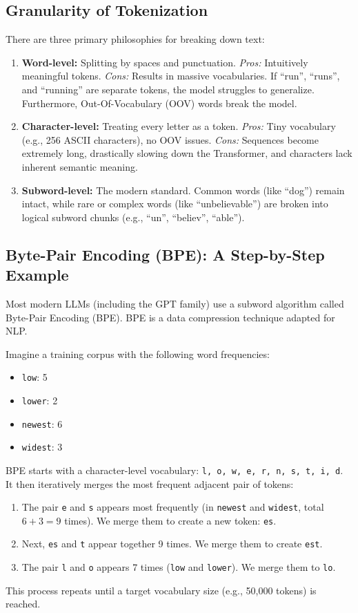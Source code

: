 \documentclass[11pt, a4paper]{article}
\begin{document}
\subsection{Granularity of Tokenization}
There are three primary philosophies for breaking down text:
\begin{enumerate}
    \item \textbf{Word-level:} Splitting by spaces and punctuation. \textit{Pros:} Intuitively meaningful tokens. \textit{Cons:} Results in massive vocabularies. If ``run'', ``runs'', and ``running'' are separate tokens, the model struggles to generalize. Furthermore, Out-Of-Vocabulary (OOV) words break the model.
    \item \textbf{Character-level:} Treating every letter as a token. \textit{Pros:} Tiny vocabulary (e.g., 256 ASCII characters), no OOV issues. \textit{Cons:} Sequences become extremely long, drastically slowing down the Transformer, and characters lack inherent semantic meaning.
    \item \textbf{Subword-level:} The modern standard. Common words (like ``dog'') remain intact, while rare or complex words (like ``unbelievable'') are broken into logical subword chunks (e.g., ``un'', ``believ'', ``able'').
\end{enumerate}

\subsection{Byte-Pair Encoding (BPE): A Step-by-Step Example}
Most modern LLMs (including the GPT family) use a subword algorithm called Byte-Pair Encoding (BPE). BPE is a data compression technique adapted for NLP. 

Imagine a training corpus with the following word frequencies:
\begin{itemize}
    \item \texttt{low}: 5
    \item \texttt{lower}: 2
    \item \texttt{newest}: 6
    \item \texttt{widest}: 3
\end{itemize}

BPE starts with a character-level vocabulary: \texttt{l, o, w, e, r, n, s, t, i, d}. It then iteratively merges the most frequent adjacent pair of tokens:
\begin{enumerate}
    \item The pair \texttt{e} and \texttt{s} appears most frequently (in \texttt{newest} and \texttt{widest}, total $6+3=9$ times). We merge them to create a new token: \texttt{es}.
    \item Next, \texttt{es} and \texttt{t} appear together 9 times. We merge them to create \texttt{est}.
    \item The pair \texttt{l} and \texttt{o} appears 7 times (\texttt{low} and \texttt{lower}). We merge them to \texttt{lo}.
\end{enumerate}
This process repeats until a target vocabulary size (e.g., 50,000 tokens) is reached. 
\end{document}
